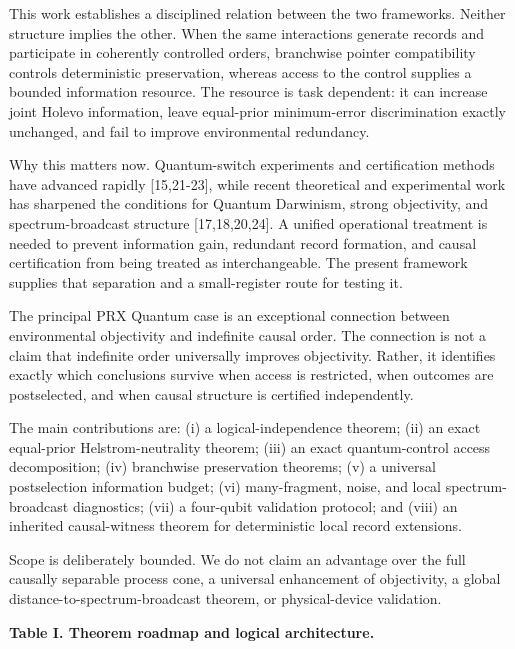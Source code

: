 \documentclass[
]{article}
\begin{document}
This work establishes a disciplined relation between the two frameworks.
Neither structure implies the other. When the same interactions generate
records and participate in coherently controlled orders, branchwise
pointer compatibility controls deterministic preservation, whereas
access to the control supplies a bounded information resource. The
resource is task dependent: it can increase joint Holevo information,
leave equal-prior minimum-error discrimination exactly unchanged, and
fail to improve environmental redundancy.

Why this matters now. Quantum-switch experiments and certification
methods have advanced rapidly {[}15,21-23{]}, while recent theoretical
and experimental work has sharpened the conditions for Quantum
Darwinism, strong objectivity, and spectrum-broadcast structure
{[}17,18,20,24{]}. A unified operational treatment is needed to prevent
information gain, redundant record formation, and causal certification
from being treated as interchangeable. The present framework supplies
that separation and a small-register route for testing it.

The principal PRX Quantum case is an exceptional connection between
environmental objectivity and indefinite causal order. The connection is
not a claim that indefinite order universally improves objectivity.
Rather, it identifies exactly which conclusions survive when access is
restricted, when outcomes are postselected, and when causal structure is
certified independently.

The main contributions are: (i) a logical-independence theorem; (ii) an
exact equal-prior Helstrom-neutrality theorem; (iii) an exact
quantum-control access decomposition; (iv) branchwise preservation
theorems; (v) a universal postselection information budget; (vi)
many-fragment, noise, and local spectrum-broadcast diagnostics; (vii) a
four-qubit validation protocol; and (viii) an inherited causal-witness
theorem for deterministic local record extensions.

Scope is deliberately bounded. We do not claim an advantage over the
full causally separable process cone, a universal enhancement of
objectivity, a global distance-to-spectrum-broadcast theorem, or
physical-device validation.

\textbf{Table I. Theorem roadmap and logical architecture.}
\end{document}

